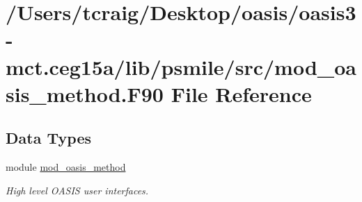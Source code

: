 \hypertarget{mod__oasis__method_8_f90}{\section{/\+Users/tcraig/\+Desktop/oasis/oasis3-\/mct.ceg15a/lib/psmile/src/mod\+\_\+oasis\+\_\+method.F90 File Reference}
\label{mod__oasis__method_8_f90}
}
\subsection*{Data Types}
\begin{DoxyCompactItemize}
\item 
module \hyperlink{classmod__oasis__method}{mod\+\_\+oasis\+\_\+method}
\begin{DoxyCompactList}\small\item\em High level O\+A\+S\+I\+S user interfaces. \end{DoxyCompactList}\end{DoxyCompactItemize}
